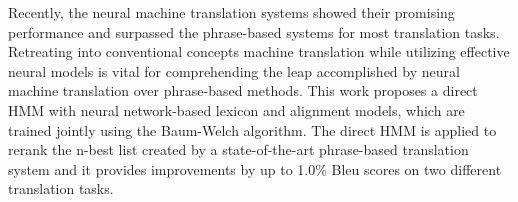 Recently, the neural machine translation systems showed their promising performance and surpassed the phrase-based systems for most translation tasks. Retreating into conventional concepts machine translation while utilizing effective neural models is vital for comprehending the leap accomplished by neural machine translation over phrase-based methods. This work proposes a direct HMM with neural network-based lexicon and alignment models, which are trained jointly using the Baum-Welch algorithm. The direct HMM is applied to rerank the n-best list created by a state-of-the-art phrase-based translation system and it provides improvements by up to 1.0\% Bleu scores on two different translation tasks.
